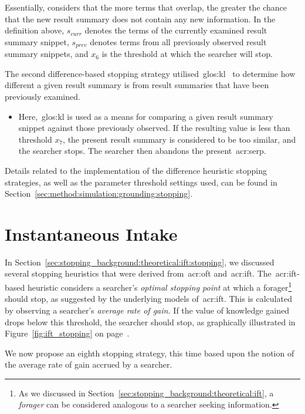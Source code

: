 Essentially,  considers that the more terms that overlap, the greater the chance that the new result summary does not contain any new information. In the definition above, $s_{curr}$ denotes the terms of the currently examined result summary snippet, $s_{prev}$ denotes terms from all previously observed result summary snippets, and $x_6$ is the threshold at which the searcher will stop.

The second difference-based stopping strategy utilised~\gls{glos:kl}~\citep{kullback1951information} to determine how different a given result summary is from result summaries that have been previously examined.

\begin{itemize}
    \item{ Here,~\gls{glos:kl} is used as a means for comparing a given result summary snippet against those previously observed. If the resulting value is less than threshold $x_7$, the present result summary is considered to be too similar, and the searcher stops. The searcher then abandons the present~\gls{acr:serp}.}
\end{itemize}

Details related to the implementation of the difference heuristic stopping strategies, as well as the parameter threshold settings used, can be found in Section~\ref{sec:method:simulation:grounding:stopping}.

\section{Instantaneous Intake}
In Section~\ref{sec:stopping_background:theoretical:ift:stopping}, we discussed several stopping heuristics that were derived from~\gls{acr:oft} and~\gls{acr:ift}. The~\gls{acr:ift}-based heuristic considers a searcher's \emph{optimal stopping point} at which a forager\footnote{As we discussed in Section~\ref{sec:stopping_background:theoretical:ift}, a \emph{forager} can be considered analogous to a searcher seeking information.} should stop, as suggested by the underlying models of~\gls{acr:ift}. This is calculated by observing a searcher's \emph{average rate of gain.} If the value of knowledge gained drops below this threshold, the searcher should stop, as graphically illustrated in Figure~\ref{fig:ift_stopping} on page~\pageref{fig:ift_stopping}.

We now propose an eighth stopping strategy, this time based upon the notion of the average rate of gain accrued by a searcher.

